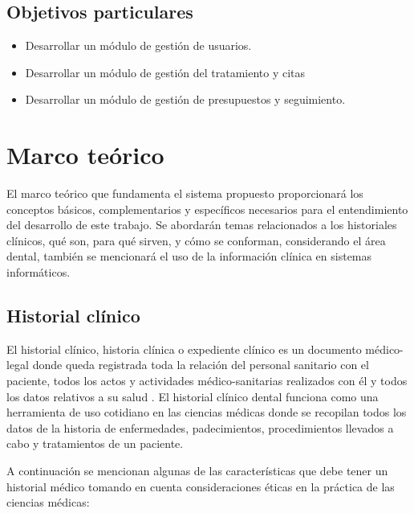 \subsection{Objetivos particulares}

\begin{itemize}
\item Desarrollar un módulo de gestión de usuarios.
\item Desarrollar un módulo de gestión del tratamiento y citas
\item Desarrollar un módulo de gestión de presupuestos y seguimiento.
\end{itemize}


\newpage
\section{Marco teórico}

El marco teórico que fundamenta el sistema propuesto proporcionará los conceptos básicos, complementarios y específicos necesarios para el entendimiento del desarrollo de este trabajo. Se abordarán temas relacionados a los historiales clínicos, qué son, para qué sirven, y cómo se conforman, considerando el área dental, también se mencionará el uso de la información clínica en sistemas informáticos.

\subsection{Historial clínico}

El historial clínico, historia clínica o expediente clínico es un documento médico-legal donde queda registrada toda la relación del personal sanitario con el paciente, todos los actos y actividades médico-sanitarias realizados con él y todos los datos relativos a su salud \cite{D03}. El historial clínico dental funciona como una herramienta de uso cotidiano en las ciencias médicas donde se recopilan todos los datos de la historia de enfermedades, padecimientos, procedimientos llevados a cabo y tratamientos de un paciente.

\vspace{1em}

A continuación se mencionan algunas de las características que debe tener un historial médico tomando en cuenta consideraciones éticas en la práctica de las ciencias médicas:

